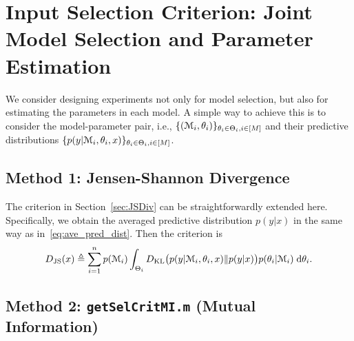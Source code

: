 \documentclass[11pt]{article}
\numberwithin{equation}{section}
\begin{document}
\section{Input Selection Criterion: Joint Model Selection and Parameter Estimation}

We consider designing experiments not only for model selection, but also for estimating the parameters in each model. A simple way to achieve this is to consider the model-parameter pair, i.e., $\{(\mathcal{M}_i,\theta_i)\}_{\theta_i\in\Theta_i,i\in[M]}$ and their predictive distributions $\{p(y|\mathcal{M}_i,\theta_i,x)\}_{\theta_i\in\Theta_i,i\in[M]}$. 

\subsection{Method 1: Jensen-Shannon Divergence}
The criterion in Section~\ref{sec:JSDiv} can be straightforwardly extended here. Specifically, we obtain the averaged predictive distribution $p(y|x)$ in the same way as in~\eqref{eq:ave_pred_dist}. Then the criterion is
\begin{align*}
D_{\rm JS}(x) \triangleq \sum_{i=1}^n p(\mathcal{M}_i) \int_{\Theta_i} D_{\rm KL}\big(p(y|\mathcal{M}_i,\theta_i,x) \Vert p(y|x)\big) p(\theta_i|\mathcal{M}_i)\; \mathrm{d} \theta_i.
\end{align*}

\subsection{Method 2: {\tt getSelCritMI.m} (Mutual Information)}
\end{document}
